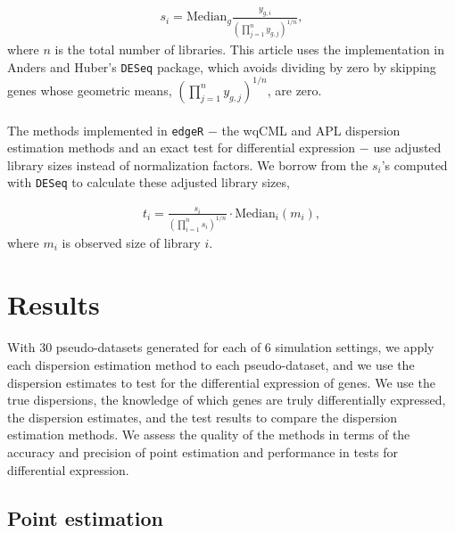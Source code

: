 \documentclass[10pt]{article}
\begin{document}
\begin{align*}
s_i = \text{Median}_g \frac{y_{g, i}}{ \left (\prod_{j = 1}^n y_{g, j} \right)^{1/n}},
\end{align*}
where $n$ is the total number of libraries. This article uses the implementation in Anders and Huber's {\tt DESeq} package, which avoids dividing by zero by skipping genes whose geometric means, $\left (\prod_{j = 1}^n y_{g, j} \right)^{1/n}$, are zero.

\paragraph{} \indent The methods implemented in {\tt edgeR} $-$ the wqCML and APL dispersion estimation methods and an exact test for differential expression $-$ use adjusted library sizes instead of normalization factors. We borrow from the $s_i$'s computed with {\tt DESeq} to calculate these adjusted library sizes,

\begin{align*}
t_i = \frac{s_i}{ \left (\prod_{i = 1}^n s_i \right)^{1/n}} \cdot \text{Median}_i (m_i),
\end{align*} where $m_i$ is observed size of library $i$.

\section*{Results}

\paragraph{} \indent With 30 pseudo-datasets generated for each of 6 simulation settings, we apply each dispersion estimation method to each pseudo-dataset, and we use the dispersion estimates to test for the differential expression of genes. We use the true dispersions, the knowledge of which genes are truly differentially expressed, the dispersion estimates, and the test results to compare the dispersion estimation methods. We assess the quality of the methods in terms of the accuracy and precision of point estimation and performance in tests for differential expression.

\subsection*{Point estimation}

\end{document}

